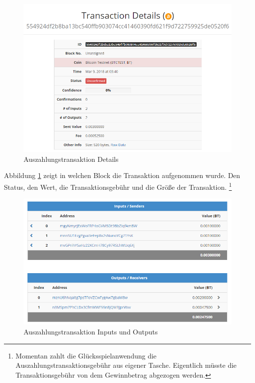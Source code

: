 \begin{figure}[H]
\centering
\includegraphics[width=1\linewidth]{Figures/btc_gui/btc_txn}
\decoRule
\caption{Auszahlungstransaktion Details}
\label{fig:btc_txn}
\end{figure}

Abbildung \ref{fig:btc_txn} zeigt in welchen Block die Transaktion aufgenommen wurde. Den Status, den Wert, die Transaktionsgebühr und die Größe der Transaktion.
\footnote{Momentan zahlt die Glücksspielanwendung die Auszahlungstransaktionsgebühr aus eigener Tasche. Eigentlich müsste die Transaktionsgebühr von dem Gewinnbetrag abgezogen werden.}

\begin{figure}[H]
\centering
\includegraphics[width=1\linewidth]{Figures/btc_gui/btc_txn_input_output}
\decoRule
\caption{Auszahlungstransaktion Inputs und Outputs}
\label{fig:btc_txn_input_output}
\end{figure}


